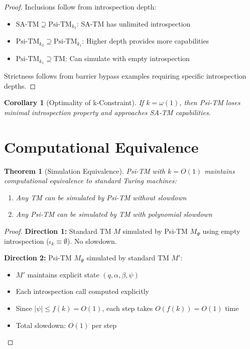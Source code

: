 \documentclass[11pt]{article}
\newtheorem{theorem}{Theorem}
\newtheorem{corollary}{Corollary}
\begin{document}
\begin{proof}
Inclusions follow from introspection depth:
\begin{itemize}
\item $\text{SA-TM} \supseteq \text{Psi-TM}_{k_2}$: SA-TM has unlimited introspection
\item $\text{Psi-TM}_{k_2} \supseteq \text{Psi-TM}_{k_1}$: Higher depth provides more capabilities  
\item $\text{Psi-TM}_{k_1} \supseteq \text{TM}$: Can simulate with empty introspection
\end{itemize}
Strictness follows from barrier bypass examples requiring specific introspection depths.
\end{proof}

\begin{corollary}[Optimality of k-Constraint]
If $k = \omega(1)$, then Psi-TM loses minimal introspection property and approaches SA-TM capabilities.
\end{corollary}

\section{Computational Equivalence}

\begin{theorem}[Simulation Equivalence]
\label{thm:equivalence}
Psi-TM with $k = O(1)$ maintains computational equivalence to standard Turing machines:
\begin{enumerate}
\item Any TM can be simulated by Psi-TM without slowdown
\item Any Psi-TM can be simulated by TM with polynomial slowdown
\end{enumerate}
\end{theorem}

\begin{proof}
\textbf{Direction 1:} Standard TM $M$ simulated by Psi-TM $M_\Psi$ using empty introspection ($\iota_k \equiv \emptyset$). No slowdown.

\textbf{Direction 2:} Psi-TM $M_\Psi$ simulated by standard TM $M'$:
\begin{itemize}
\item $M'$ maintains explicit state $(q, \alpha, \beta, \psi)$ 
\item Each introspection call computed explicitly
\item Since $|\psi| \leq f(k) = O(1)$, each step takes $O(f(k)) = O(1)$ time
\item Total slowdown: $O(1)$ per step
\end{itemize}
\end{proof}
\end{document}
